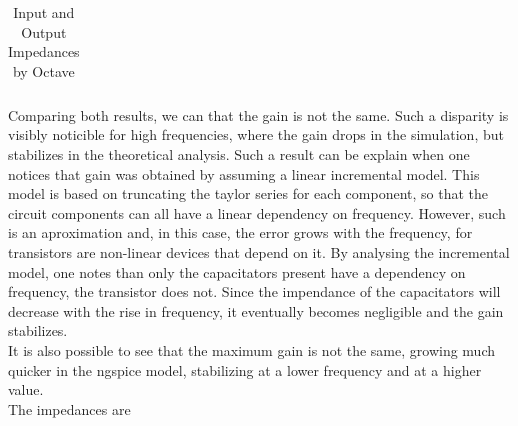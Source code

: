%    

\FloatBarrier
\begin{table}[h]
  \centering
  \begin{tabular}{|c|c|}
    \hline    
    
    \hline
  \end{tabular}
  \caption{Input and Output Impedances by Octave}
  \label{tab:Spice1}
\end{table}
\FloatBarrier   


Comparing both results, we can that the gain is not the same. Such a disparity is visibly noticible for high frequencies, where the gain drops in the simulation, but stabilizes in the theoretical analysis. Such a result can be explain when one notices that gain was obtained by assuming a linear incremental model. This model is based on truncating the taylor series for each component, so that the circuit components can all have a linear dependency on frequency. However, such is an aproximation and, in this case, the error grows with the frequency, for transistors are non-linear devices that depend on it. By analysing the incremental model, one notes than only the capacitators present have a dependency on frequency, the transistor does not. Since the impendance of the capacitators will decrease with the rise in frequency, it eventually becomes negligible and the gain stabilizes.\\
It is also possible to see that the maximum gain is not the same, growing much quicker in the ngspice model, stabilizing at a lower frequency and at a higher value.\\
The impedances are 





